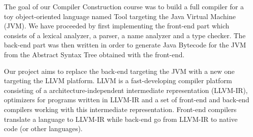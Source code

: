 The goal of our Compiler Construction course was to build a full compiler for a toy object-oriented language named Tool targeting the Java Virtual Machine (JVM). We have proceeded by first implementing the front-end part which consists of a lexical analyzer, a parser, a name analyzer and a type checker. The back-end part was then written in order to generate Java Bytecode for the JVM from the Abstract Syntax Tree obtained with the front-end.

Our project aims to replace the back-end targeting the JVM with a new one targeting the LLVM platform. LLVM is a fast-developing compiler platform consisting of a architecture-independent intermediate representation (LLVM-IR), optimizers for programs written in LLVM-IR and a set of front-end and back-end compilers working with this intermediate representation. Front-end compilers translate a language to LLVM-IR while back-end go from LLVM-IR to native code (or other languages).
